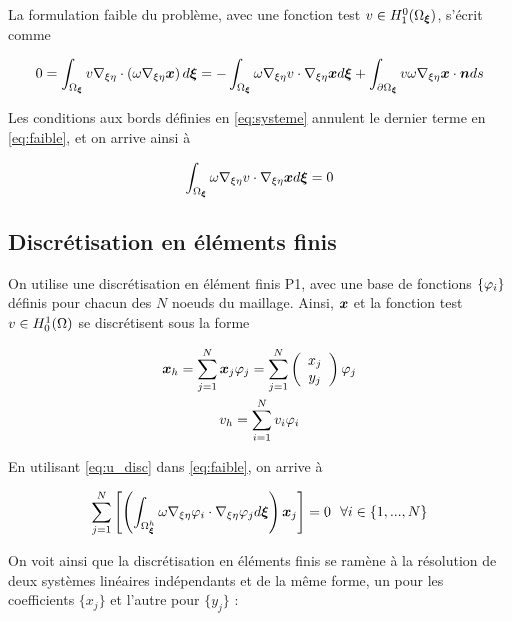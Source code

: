 \indent La formulation faible du problème, avec une fonction test  \(v \in H_1^0(\Omega_{\boldsymbol{\xi}})\), s'écrit comme

\begin{equation}
	\label{eq:faible}
	0 = \int_{\Omega_{\boldsymbol{\xi}}}{v\nabla_{\xi\eta} \cdot \left( \omega \nabla_{\xi\eta} \boldsymbol{x} \right) d\boldsymbol{\xi}} = -\int_{\Omega_{\boldsymbol{\xi}}}{\omega \nabla_{\xi\eta} v \cdot \nabla_{\xi\eta} \boldsymbol{x} d\boldsymbol{\xi}} + \int_{\partial \Omega_{\boldsymbol{\xi}}}{v\omega\nabla_{\xi\eta} \boldsymbol{x} \cdot \boldsymbol{n} ds} 
\end{equation}

\indent Les conditions aux bords définies en \eqref{eq:systeme} annulent le dernier terme en \eqref{eq:faible}, et on arrive ainsi à 

\begin{equation*}
	\int_{\Omega_{\boldsymbol{\xi}}}{\omega \nabla_{\xi\eta} v \cdot \nabla_{\xi\eta} \boldsymbol{x} d\boldsymbol{\xi}} = 0
\end{equation*}




\subsection{Discrétisation en éléments finis}

\indent On utilise une discrétisation en élément finis P1, avec une base de fonctions \(\{\varphi_i\}\) définis pour chacun des \(N\) noeuds du maillage. Ainsi, \(\boldsymbol{x}\) et la fonction test \(v \in H_0^1(\Omega)\) se discrétisent sous la forme

\begin{equation}
  \label{eq:u_disc}
  \begin{gathered}
  \boldsymbol{x}_h = \sum_{j=1}^N{\boldsymbol{x}_j\varphi_j} = \sum_{j=1}^N{ \left( \begin{array}{c}  x_j \\ y_j \end{array} \right)    \varphi_j} \\
  v_h = \sum_{i=1}^N{v_i\varphi_i} 
  \end{gathered}
\end{equation}

\indent En utilisant \eqref{eq:u_disc} dans \eqref{eq:faible}, on arrive à

\begin{equation*}
	\sum_{j=1}^N{ \left[  \left( \int_{\Omega_{\boldsymbol{\xi}}^h}{ \omega \nabla_{\xi\eta} \varphi_i \cdot \nabla_{\xi\eta} \varphi_j  d\boldsymbol{\xi}}  \right)  \boldsymbol{x}_j \right] } = 0 \ \ \forall i \in \{1,...,N\}
\end{equation*}

\indent On voit ainsi que la discrétisation en éléments finis se ramène à la résolution de deux systèmes linéaires indépendants et de la même forme, un pour les coefficients \(\{x_j\}\) et l'autre pour \(\{y_j\}\) : 

